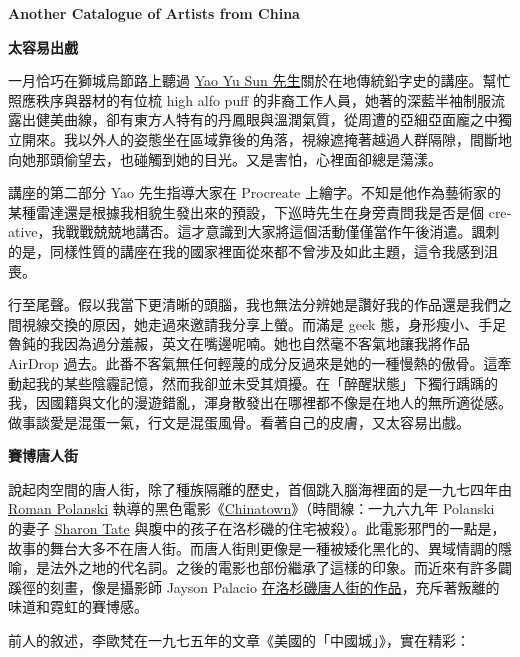 \documentclass[10pt]{article}
\begin{document}
\begin{flushleft}
\textbf{Another Catalogue of Artists from China}\\
\end{flushleft}
\vspace{3em}

\textbf{太容易出戲}

一月恰巧在獅城烏節路上聽過 \href{https://typesettingsg.com}{Yao Yu Sun
先生}關於在地傳統鉛字史的講座。幫忙照應秩序與器材的有位梳 high alfo puff
的非裔工作人員，她著的深藍半袖制服流露出健美曲線，卻有東方人特有的丹鳳眼與溫潤氣質，從周遭的亞細亞面龐之中獨立開來。我以外人的姿態坐在區域靠後的角落，視線遮掩著越過人群隔隙，間斷地向她那頭偷望去，也碰觸到她的目光。又是害怕，心裡面卻總是蕩漾。

講座的第二部分 Yao 先生指導大家在 Pro­cre­ate
上繪字。不知是他作為藝術家的某種雷達還是根據我相貌生發出來的預設，下巡時先生在身旁責問我是否是個
cre­at­ive，我戰戰兢兢地講否。這才意識到大家將這個活動僅僅當作午後消遣。諷刺的是，同樣性質的講座在我的國家裡面從來都不曾涉及如此主題，這令我感到沮喪。

行至尾聲。假以我當下更清晰的頭腦，我也無法分辨她是讚好我的作品還是我們之間視線交換的原因，她走過來邀請我分享上螢。而滿是
geek
態，身形瘦小、手足魯鈍的我因為過分羞赧，英文在嘴邊呢喃。她也自然毫不客氣地讓我將作品
AirDrop
過去。此番不客氣無任何輕蔑的成分反過來是她的一種慢熱的傲骨。這牽動起我的某些陰霾記憶，然而我卻並未受其煩擾。在「醉醒狀態」下獨行踽踽的我，因國籍與文化的漫遊錯亂，渾身散發出在哪裡都不像是在地人的無所適從感。做事談愛是混蛋一氣，行文是混蛋風骨。看著自己的皮膚，又太容易出戲。

\vspace{1em}
\textbf{賽博唐人街}

說起肉空間的唐人街，除了種族隔離的歷史，首個跳入腦海裡面的是一九七四年由
\href{https://en.wikipedia.org/wiki/Roman_Polanski}{Ro­man Po­lanski}
執導的黑色電影《\href{https://en.wikipedia.org/wiki/Chinatown_(1974_film)}{Chin­atown}》（時間線：一九六九年
Polanski 的妻子 \href{https://en.wikipedia.org/wiki/Sharon_Tate}{Shar­on
Tate}
與腹中的孩子在洛杉磯的住宅被殺）。此電影邪門的一點是，故事的舞台大多不在唐人街。而唐人街則更像是一種被矮化黑化的、異域情調的隱喻，是法外之地的代名詞。之後的電影也部份繼承了這樣的印象。而近來有許多闢蹊徑的刻畫，像是攝影師
Jay­son Pala­cio
\href{https://hypebeast.com/2018/2/gosha-rubchinskiy-brain-dead-blends-editorial}{在洛杉磯唐人街的作品}，充斥著叛離的味道和霓虹的賽博感。

前人的敘述，李歐梵在一九七五年的文章《美國的「中國城」》，實在精彩：
\end{document}
